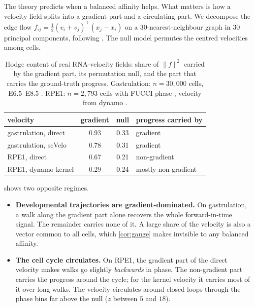 The theory predicts when a balanced affinity helps. What matters is how a
velocity field splits into a gradient part and a circulating part. We
decompose the edge flow $f_{ij}=\tfrac12(v_i+v_j)^\top(x_j-x_i)$ on a
30-nearest-neighbour graph in 30 principal components, following
\citet{jiang2011statistical}. The null model permutes the centred
velocities among cells.

\begin{table}[t]
  \caption{Hodge content of real RNA-velocity fields: share of
    $\|f\|^2$ carried by the gradient part, its permutation null, and the
    part that carries the ground-truth progress. Gastrulation:
    $n=30{,}000$ cells, E6.5--E8.5 \citep{pijuansala2019single}. RPE1:
    $n=2{,}793$ cells with FUCCI phase \citep{battich2020sequencing}, velocity
    from dynamo \citep{qiu2022mapping}.}
  \label{tab:hodge}
  \centering\small
  \begin{tabular}{@{}lccl@{}}
    \toprule
    velocity & gradient & null & progress carried by \\
    \midrule
    gastrulation, direct     & 0.93 & 0.33 & gradient \\
    gastrulation, scVelo     & 0.78 & 0.31 & gradient \\
    RPE1, direct             & 0.67 & 0.21 & non-gradient \\
    RPE1, dynamo kernel      & 0.29 & 0.24 & mostly non-gradient \\
    \bottomrule
  \end{tabular}
\end{table}

 shows two opposite regimes.
\begin{itemize}
  \item \textbf{Developmental trajectories are gradient-dominated.} On
    gastrulation, a walk along the gradient part alone recovers the whole
    forward-in-time signal. The remainder carries none of it. A large share
    of the velocity is also a vector common to all cells, which
    \cref{cor:gauge} makes invisible to any balanced affinity.
  \item \textbf{The cell cycle circulates.} On RPE1, the gradient part of
    the direct velocity makes walks go slightly \emph{backwards} in phase.
    The non-gradient part carries the progress around the cycle; for the
    kernel velocity it carries most of it over long walks. The
    velocity circulates around closed loops through the phase bins far
    above the null ($z$ between $5$ and $18$).
\end{itemize}

